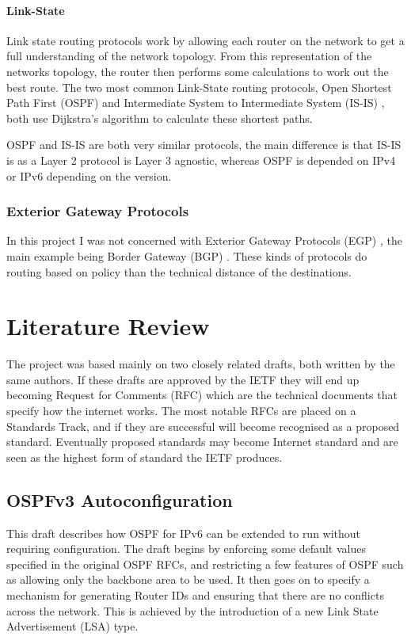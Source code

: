 \documentclass[12pt]{report}
\begin{document}
\subsubsection{Link-State}
Link state routing protocols work by allowing each router on the network to get
a full understanding of the network topology. From this representation of the
networks topology, the router then performs some calculations to work out the
best route. The two most common Link-State routing protocols, Open Shortest
Path First (OSPF)  and
Intermediate System to Intermediate System (IS-IS)
, both use
Dijkstra's algorithm to calculate these shortest paths. 

OSPF and IS-IS are both very similar protocols, the main difference is that
IS-IS is as a Layer 2 protocol is Layer 3 agnostic, whereas OSPF is depended on
IPv4 or IPv6 depending on the version.

\subsection{Exterior Gateway Protocols}
In this project I was not concerned with Exterior Gateway Protocols (EGP)
, the main example being Border
Gateway (BGP) . These kinds of
protocols do routing based on policy than the technical distance of the
destinations.

\chapter{Literature Review} 

The project was based mainly on two closely related drafts, both written by the
same authors. If these drafts are approved by the IETF they will end up
becoming Request for Comments (RFC) 
which are the technical documents that specify how the internet works. The most
notable RFCs are placed on a Standards Track, and if they are successful will
become recognised as a proposed standard. Eventually proposed standards may
become Internet standard and are seen as the highest form of standard the IETF
produces. 

\section{OSPFv3 Autoconfiguration}
This draft describes how OSPF for IPv6 can be extended to run without requiring
configuration. The draft begins by enforcing some default values specified in
the original OSPF RFCs, and restricting a few features of OSPF such as
allowing only the backbone area to be used. It then goes on to specify a
mechanism for generating Router IDs and ensuring that there are no conflicts
across the network. This is achieved by the introduction of a new Link State
Advertisement (LSA)  type.
\end{document}
